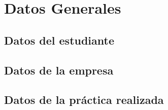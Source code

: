 \section{Datos Generales}
\subsection{Datos del estudiante}


\subsection{Datos de la empresa}


\subsection{Datos de la práctica realizada}


\newpage